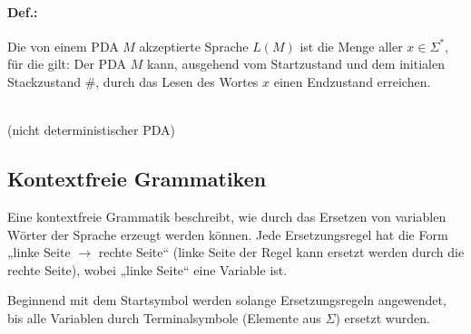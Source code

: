 \paragraph{Def.:} Die von einem PDA $M$ akzeptierte Sprache $L(M)$ ist die Menge aller $x \in \Sigma^*$, für die gilt: Der PDA $M$ kann, ausgehend vom Startzustand und dem initialen Stackzustand $\#$, durch das Lesen des Wortes $x$ einen Endzustand erreichen.\bigskip\\
\\
(nicht deterministischer PDA)

\subsection{Kontextfreie Grammatiken}
Eine kontextfreie Grammatik beschreibt, wie durch das Ersetzen von variablen Wörter der Sprache erzeugt werden können. Jede Ersetzungsregel hat die Form „linke Seite $\to$ rechte Seite“ (linke Seite der Regel kann ersetzt werden durch die rechte Seite), wobei „linke Seite“ eine Variable ist. 

Beginnend mit dem Startsymbol werden solange Ersetzungsregeln angewendet, bis alle Variablen durch Terminalsymbole (Elemente aus $\Sigma$) ersetzt wurden.

